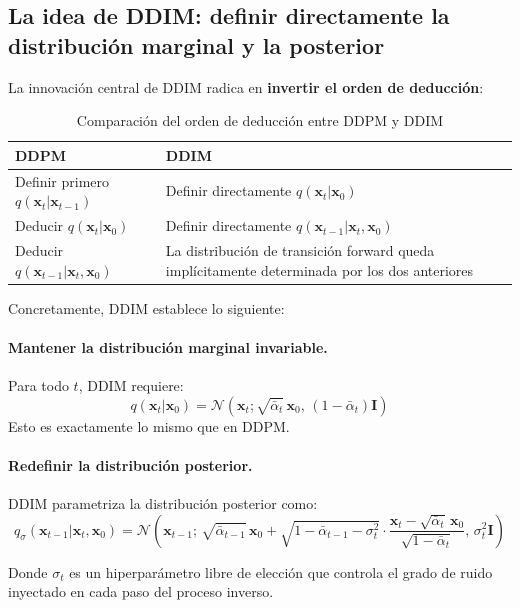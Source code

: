 \subsection{La idea de DDIM: definir directamente la distribución marginal y la posterior}

La innovación central de DDIM radica en \textbf{invertir el orden de deducción}:

\begin{table}[H]
\centering
\caption{Comparación del orden de deducción entre DDPM y DDIM}
\begin{tabular}{ll}
\toprule
\textbf{DDPM} & \textbf{DDIM} \\
\midrule
Definir primero $q(\mathbf{x}_t|\mathbf{x}_{t-1})$ & Definir directamente $q(\mathbf{x}_t|\mathbf{x}_0)$ \\
Deducir $q(\mathbf{x}_t|\mathbf{x}_0)$ & Definir directamente $q(\mathbf{x}_{t-1}|\mathbf{x}_t, \mathbf{x}_0)$ \\
Deducir $q(\mathbf{x}_{t-1}|\mathbf{x}_t, \mathbf{x}_0)$ & La distribución de transición forward queda implícitamente determinada por los dos anteriores \\
\bottomrule
\end{tabular}
\end{table}

Concretamente, DDIM establece lo siguiente:

\paragraph{Mantener la distribución marginal invariable.} Para todo $t$, DDIM requiere:
$$
q(\mathbf{x}_t | \mathbf{x}_0) = \mathcal{N}(\mathbf{x}_t; \sqrt{\bar{\alpha}_t}\,\mathbf{x}_0,\, (1-\bar{\alpha}_t)\mathbf{I})
$$
Esto es exactamente lo mismo que en DDPM.

\paragraph{Redefinir la distribución posterior.} DDIM parametriza la distribución posterior como:
$$
q_\sigma(\mathbf{x}_{t-1} | \mathbf{x}_t, \mathbf{x}_0) = \mathcal{N}\left(\mathbf{x}_{t-1};\, \sqrt{\bar{\alpha}_{t-1}}\,\mathbf{x}_0 + \sqrt{1-\bar{\alpha}_{t-1}-\sigma_t^2}\cdot\frac{\mathbf{x}_t - \sqrt{\bar{\alpha}_t}\,\mathbf{x}_0}{\sqrt{1-\bar{\alpha}_t}},\, \sigma_t^2\mathbf{I}\right)
$$

Donde $\sigma_t$ es un hiperparámetro libre de elección que controla el grado de ruido inyectado en cada paso del proceso inverso.


